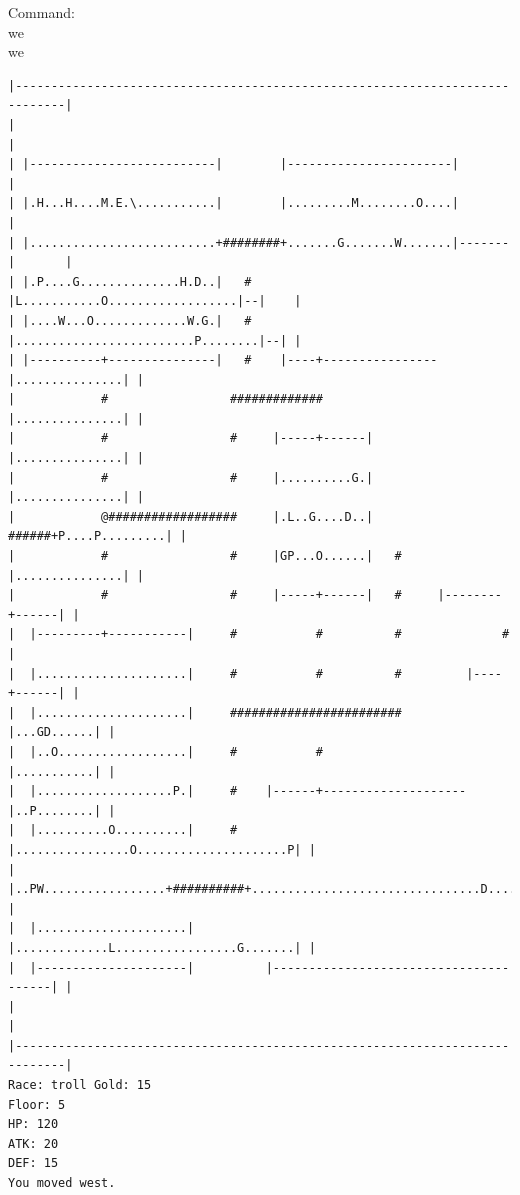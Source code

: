\documentclass[11pt]{article}
\theoremstyle{plain}
\begin{document}
Command:\\
we\\
we
\begin{Verbatim}[fontsize=\scriptsize]
|-----------------------------------------------------------------------------|
|                                                                             |
| |--------------------------|        |-----------------------|               |
| |.H...H....M.E.\...........|        |.........M........O....|               |
| |..........................+########+.......G.......W.......|-------|       |
| |.P....G..............H.D..|   #    |L...........O..................|--|    |
| |....W...O.............W.G.|   #    |.........................P........|--| |
| |----------+---------------|   #    |----+----------------|...............| |
|            #                 #############                |...............| |
|            #                 #     |-----+------|         |...............| |
|            #                 #     |..........G.|         |...............| |
|            @##################     |.L..G....D..|   ######+P....P.........| |
|            #                 #     |GP...O......|   #     |...............| |
|            #                 #     |-----+------|   #     |--------+------| |
|  |---------+-----------|     #           #          #              #        |
|  |.....................|     #           #          #         |----+------| |
|  |.....................|     ########################         |...GD......| |
|  |..O..................|     #           #                    |...........| |
|  |...................P.|     #    |------+--------------------|..P........| |
|  |..........O..........|     #    |................O.....................P| |
|  |..PW.................+##########+................................D......| |
|  |.....................|          |.............L.................G.......| |
|  |---------------------|          |---------------------------------------| |
|                                                                             |
|-----------------------------------------------------------------------------|
Race: troll Gold: 15                                                   Floor: 5
HP: 120
ATK: 20
DEF: 15
You moved west. 


\end{Verbatim}
\end{document}
